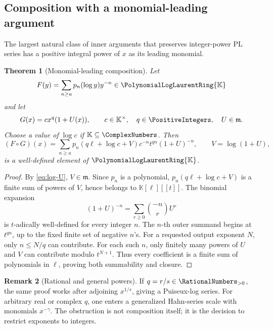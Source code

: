 \documentclass[11pt,oneside]{article}
\numberwithin{equation}{section}
\newtheorem{theorem}{Theorem}[section]
\theoremstyle{definition}
\newtheorem{remark}[theorem]{Remark}
\newcommand{\K}{\mathbb{K}}
\newcommand{\PL}{\PolynomialLogLaurentRing{\K}}
\begin{document}
\subsection{Composition with a monomial-leading argument}

The largest natural class of inner arguments that preserves integer-power PL
series has a positive integral power of \(x\) as its leading monomial.

\begin{theorem}[Monomial-leading composition]\label{thm:monomial-composition}
Let
\begin{equation}\label{eq:outer-inner-composition}
  F(y)=\sum_{n\ge a}p_n(\log y)y^{-n}\in\PL
\end{equation}
and let
\begin{equation}\label{eq:admissible-G}
  G(x)=c x^q(1+U(x)),
  \qquad c\in\K^\times,\quad q\in\PositiveIntegers,\quad U\in\mathfrak m.
\end{equation}
Choose a value of \(\log c\) if \(\K\subseteq\ComplexNumbers\).  Then
\begin{equation}\label{eq:composition-master}
\boxed{
  (F\circ G)(x)=
  \sum_{n\ge a}
  p_n\!\left(q\ell+\log c+V\right)
  c^{-n}t^{qn}(1+U)^{-n},
  \qquad V=\log(1+U),
}
\end{equation}
is a well-defined element of \(\PL\).
\end{theorem}

\begin{proof}
By \eqref{eq:log-U}, \(V\in\mathfrak m\).  Since \(p_n\) is a polynomial,
\(p_n(q\ell+\log c+V)\) is a finite sum of powers of \(V\), hence belongs to
\(\K[\ell][[t]]\).  The binomial expansion
\[
  (1+U)^{-n}=\sum_{r\ge0}\binom{-n}{r}U^r
\]
is \(t\)-adically well-defined for every integer \(n\).  The \(n\)-th outer
summand begins at \(t^{qn}\), up to the fixed finite set of negative \(n\)'s.
For a requested output exponent \(N\), only \(n\le N/q\) can contribute.  For
each such \(n\), only finitely many powers of \(U\) and \(V\) can contribute
modulo \(t^{N+1}\).  Thus every coefficient is a finite sum of polynomials in
\(\ell\), proving both summability and closure.
\end{proof}

\begin{remark}[Rational and general powers]
If \(q=r/s\in\RationalNumbers_{>0}\), the same proof works after adjoining
\(x^{1/s}\), giving a Puiseux-log series.  For arbitrary real or complex \(q\),
one enters a generalized Hahn-series scale with monomials \(x^{-\gamma}\).
The obstruction is not composition itself; it is the decision to restrict
exponents to integers.
\end{remark}
\end{document}
